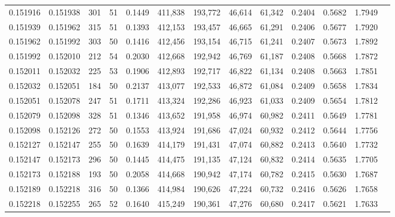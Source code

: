 \begin{tabular}{rrrrrrrrrrrrr}
0.151916 & 0.151938 &   301 &  51 &                                     0.1449 & 411,838 & 193,772 &  46,614 &  61,342 & 0.2404 & 0.5682 & 1.7949 \\
0.151939 & 0.151962 &   315 &  51 &                                     0.1393 & 412,153 & 193,457 &  46,665 &  61,291 & 0.2406 & 0.5677 & 1.7920 \\
0.151962 & 0.151992 &   303 &  50 &                                     0.1416 & 412,456 & 193,154 &  46,715 &  61,241 & 0.2407 & 0.5673 & 1.7892 \\
0.151992 & 0.152010 &   212 &  54 &                                     0.2030 & 412,668 & 192,942 &  46,769 &  61,187 & 0.2408 & 0.5668 & 1.7872 \\
0.152011 & 0.152032 &   225 &  53 &                                     0.1906 & 412,893 & 192,717 &  46,822 &  61,134 & 0.2408 & 0.5663 & 1.7851 \\
0.152032 & 0.152051 &   184 &  50 &                                     0.2137 & 413,077 & 192,533 &  46,872 &  61,084 & 0.2409 & 0.5658 & 1.7834 \\
0.152051 & 0.152078 &   247 &  51 &                                     0.1711 & 413,324 & 192,286 &  46,923 &  61,033 & 0.2409 & 0.5654 & 1.7812 \\
0.152079 & 0.152098 &   328 &  51 &                                     0.1346 & 413,652 & 191,958 &  46,974 &  60,982 & 0.2411 & 0.5649 & 1.7781 \\
0.152098 & 0.152126 &   272 &  50 &                                     0.1553 & 413,924 & 191,686 &  47,024 &  60,932 & 0.2412 & 0.5644 & 1.7756 \\
0.152127 & 0.152147 &   255 &  50 &                                     0.1639 & 414,179 & 191,431 &  47,074 &  60,882 & 0.2413 & 0.5640 & 1.7732 \\
0.152147 & 0.152173 &   296 &  50 &                                     0.1445 & 414,475 & 191,135 &  47,124 &  60,832 & 0.2414 & 0.5635 & 1.7705 \\
0.152173 & 0.152188 &   193 &  50 &                                     0.2058 & 414,668 & 190,942 &  47,174 &  60,782 & 0.2415 & 0.5630 & 1.7687 \\
0.152189 & 0.152218 &   316 &  50 &                                     0.1366 & 414,984 & 190,626 &  47,224 &  60,732 & 0.2416 & 0.5626 & 1.7658 \\
0.152218 & 0.152255 &   265 &  52 &                                     0.1640 & 415,249 & 190,361 &  47,276 &  60,680 & 0.2417 & 0.5621 & 1.7633 \\

\end{tabular}

